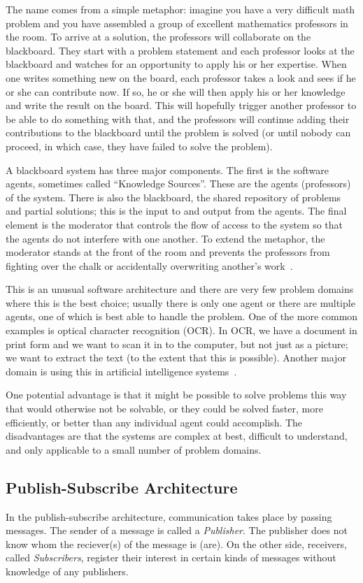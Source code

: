 The name comes from a simple metaphor: imagine you have a very difficult math problem and you have assembled a group of excellent mathematics professors in the room. To arrive at a solution, the professors will collaborate on the blackboard. They start with a problem statement and each professor looks at the blackboard and watches for an opportunity to apply his or her expertise. When one writes something new on the board, each professor takes a look and sees if he or she can contribute now. If so, he or she will then apply his or her knowledge and write the result on the board. This will hopefully trigger another professor to be able to do something with that, and the professors will continue adding their contributions to the blackboard until the problem is solved (or until nobody can proceed, in which case, they have failed to solve the problem).

A blackboard system has three major components. The first is the software agents, sometimes called ``Knowledge Sources''. These are the agents (professors) of the system. There is also the blackboard, the shared repository of problems and partial solutions; this is the input to and output from the agents. The final element is the moderator that controls the flow of access to the system so that the agents do not interfere with one another. To extend the metaphor, the moderator stands at the front of the room and prevents the professors from fighting over the chalk or accidentally overwriting another's work~\cite{blackboard}.

This is an unusual software architecture and there are very few problem domains where this is the best choice; usually there is only one agent or there are multiple agents, one of which is best able to handle the problem. One of the more common examples is optical character recognition (OCR). In OCR, we have a document in print form and we want to scan it in to the computer, but not just as a picture; we want to extract the text (to the extent that this is possible). Another major domain is using this in artificial intelligence systems~\cite{blackboard2}.

One potential advantage is that it might be possible to solve problems this way that would otherwise not be solvable, or they could be solved faster, more efficiently, or better than any individual agent could accomplish. The disadvantages are that the systems are complex at best, difficult to understand, and only applicable to a small number of problem domains.


\subsection*{Publish-Subscribe Architecture}
In the publish-subscribe architecture, communication takes place by passing messages. The sender of a message is called a \textit{Publisher}. The publisher does not know whom the reciever(s) of the message is (are). On the other side, receivers, called \textit{Subscribers}, register their interest in certain kinds of messages without knowledge of any publishers.

